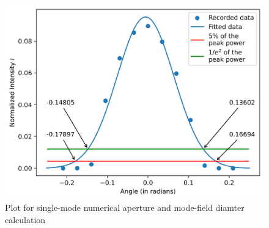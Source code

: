 \documentclass[%
 reprint,
nofootinbib,
 amsmath,amssymb,
 aps,
]{revtex4-2}
\begin{document}
\begin{figure}
	\includegraphics[scale = 0.56]{singlemodeNA}
	\caption{Plot for single-mode numerical aperture and mode-field diamter calculation}
	\label{fig:smNA}
\end{figure}
\end{document}
